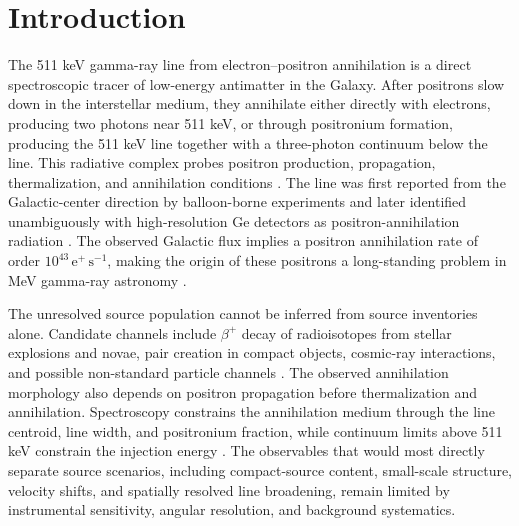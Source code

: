 \documentclass[preprint,12pt]{elsarticle}
\begin{document}

\section{Introduction}
\label{sec:intro}

The 511 keV gamma-ray line from electron--positron annihilation is a direct spectroscopic tracer of low-energy antimatter in the Galaxy. After positrons slow down in the interstellar medium, they annihilate either directly with electrons, producing two photons near 511 keV, or through positronium formation, producing the 511 keV line together with a three-photon continuum below the line. This radiative complex probes positron production, propagation, thermalization, and annihilation conditions \cite{Prantzos2011}. The line was first reported from the Galactic-center direction by balloon-borne experiments and later identified unambiguously with high-resolution Ge detectors as positron-annihilation radiation \cite{Prantzos2011}. The observed Galactic flux implies a positron annihilation rate of order $10^{43}\,\mathrm{e^+\,s^{-1}}$, making the origin of these positrons a long-standing problem in MeV gamma-ray astronomy \cite{Prantzos2011,Kierans2020}.

The unresolved source population cannot be inferred from source inventories alone. Candidate channels include $\beta^+$ decay of radioisotopes from stellar explosions and novae, pair creation in compact objects, cosmic-ray interactions, and possible non-standard particle channels \cite{Prantzos2011,Siegert2016AA,Yoneda2025}. The observed annihilation morphology also depends on positron propagation before thermalization and annihilation. Spectroscopy constrains the annihilation medium through the line centroid, line width, and positronium fraction, while continuum limits above 511 keV constrain the injection energy \cite{Prantzos2011,Siegert2016AA}. The observables that would most directly separate source scenarios, including compact-source content, small-scale structure, velocity shifts, and spatially resolved line broadening, remain limited by instrumental sensitivity, angular resolution, and background systematics.
\end{document}
